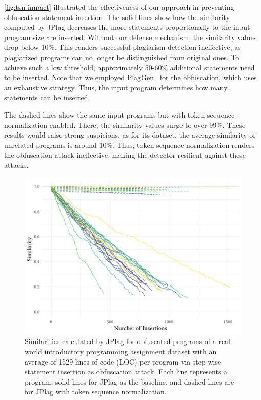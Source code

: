 \autoref{fig:tsn-impact} illustrated the effectiveness of our approach in preventing obfuscation statement insertion.
The solid lines show how the similarity computed by JPlag decreases the more statements proportionally to the input program size are inserted.
Without our defense mechanism, the similarity values drop below 10\%. This renders successful plagiarism detection ineffective, as plagiarized programs can no longer be distinguished from original ones.
To achieve such a low threshold, approximately 50-60\% additional statements need to be inserted.
Note that we employed PlagGen~\cite{Broedel2023} for the obfuscation, which uses an exhaustive strategy. Thus, the input program determines how many statements can be inserted. 

The dashed lines show the same input programs but with token sequence normalization enabled. 
There, the similarity values surge to over 99\%. These results would raise strong suspicions, as for its dataset, the average similarity of unrelated programs is around 10\%. Thus, token sequence normalization renders the obfuscation attack ineffective, making the detector resilient against these attacks.

\begin{figure}[ht]
    \centering
    \includegraphics[width=1\linewidth]{figures/eval-tsn-steps.pdf}
    \caption[Impact of Token Sequence Normalization]{Similarities calculated by JPlag for obfuscated programs of a real-world introductory programming assignment dataset with an average of 1529 lines of code (LOC) per program via step-wise statement insertion as obfuscation attack. Each line represents a program, solid lines for JPlag as the baseline, and dashed lines are for JPlag with token sequence normalization.}
    \label{fig:tsn-impact}
\end{figure}

